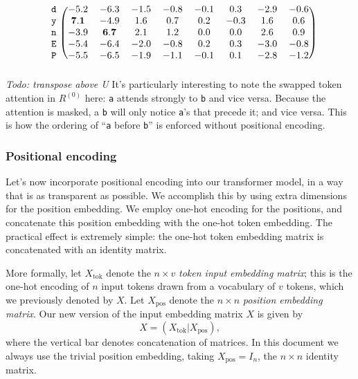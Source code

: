 \documentclass{article}
\newcommand{\td}{\mathtt{d}}
\newcommand{\tn}{\mathtt{n}}
\newcommand{\ty}{\mathtt{y}}
\newcommand{\tE}{\mathtt{E}}
\newcommand{\tP}{\mathtt{P}}
\newcommand{\by}{\times}
\newcommand{\todo}[1]{\emph{Todo: #1}}
\begin{document}
\begin{displaymath}
\begin{aligned}
\begin{blockarray}{ccccccccc}
\begin{block}{r(cccccccc)}
        \td & -5.2 & -6.3 & -1.5 & -0.8 & -0.1 & 0.3 & -2.9 & -0.6 \\
        \ty & \mathbf{7.1} & -4.9 & 1.6 & 0.7 & 0.2 & -0.3 & 1.6 & 0.6 \\
        \tn & -3.9 & \mathbf{6.7} & 2.1 & 1.2 & 0.0 & 0.0 & 2.6 & 0.9 \\
        \tE & -5.4 & -6.4 & -2.0 & -0.8 & 0.2 & 0.3 & -3.0 & -0.8 \\
        \tP & -5.5 & -6.5 & -1.9 & -1.1 & -0.1 & 0.1 & -2.8 & -1.2 \\
      \end{block}
    \end{blockarray} \\    
  \end{aligned}
\end{displaymath}
\todo{transpose above U}
It's particularly interesting to note the swapped token attention in
$R^{(0)}$ here: \texttt{a} attends strongly to \texttt{b} and vice
versa. Because the attention is masked, a \texttt{b} will only notice
\texttt{a}'s that precede it; and vice versa. This is how the ordering
of ``\texttt{a} before \texttt{b}'' is enforced without positional
encoding.

\subsubsection*{Positional encoding}

Let's now incorporate positional encoding into our transformer model,
in a way that is as transparent as possible. We accomplish this by
using extra dimensions for the position embedding. We employ one-hot
encoding for the positions, and concatenate this position embedding
with the one-hot token embedding. The practical effect is extremely
simple: the one-hot token embedding matrix is concatenated with an
identity matrix.

More formally, let $X_\text{tok}$ denote the $n \by v$ \emph{token
  input embedding matrix}; this is the one-hot encoding of $n$ input
tokens drawn from a vocabulary of $v$ tokens, which we previously
denoted by $X$.  Let $X_\text{pos}$ denote the $n \by n$
\emph{position embedding matrix}.  Our new version of the input
embedding matrix $X$ is given by
\begin{displaymath}
  X = \left( X_\text{tok} | X_\text{pos} \right),
\end{displaymath}
where the vertical bar denotes concatenation of matrices.  In this
document we always use the trivial position embedding, taking
$X_\text{pos}=I_n$, the $n \by n$ identity matrix.
\end{document}
